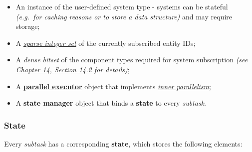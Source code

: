 \documentclass[twoside, 12pt, a4paper, openany]{book}
\begin{document}
\begin{itemize}
\item
  An instance of the user-defined system type - systems can be stateful
  \emph{(e.g.~for caching reasons or to store a data structure)} and may
  require storage;
\item
  A \protect\hyperlink{appendix_sparse_integer_sets}{\emph{sparse
  integer set}} of the currently subscribed entity IDs;
\item
  A \emph{dense bitset} of the component types required for system
  subscription \emph{(see
  \protect\hyperlink{appendix_component_bitset_creation}{Chapter 14,
  Section 14.2} for details)};
\item
  A \protect\hyperlink{multithreading_par_executor}{\textbf{parallel
  executor}} object that implements
  \protect\hyperlink{multithreading_inner_par}{\emph{inner
  parallelism}};
\item
  A \textbf{state manager} object that binds a \textbf{state} to every
  \emph{subtask}.
\end{itemize}

\hypertarget{storage_state}{\subsubsection{State}\label{storage_state}}

Every \emph{subtask} has a corresponding \textbf{state}, which stores
the following elements:
\end{document}
